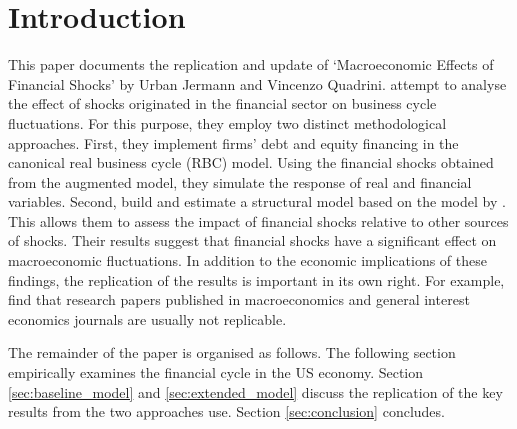 \section{Introduction}
\label{sec:introduction}

This paper documents the replication and update of ‘Macroeconomic Effects of Financial Shocks’ by Urban Jermann and Vincenzo Quadrini. \citeauthor{JERMANNfinancial} attempt to analyse the effect of shocks originated in the financial sector on business cycle fluctuations. For this purpose, they employ two distinct methodological approaches. First, they implement firms' debt and equity financing in the canonical real business cycle (RBC) model. Using the financial shocks obtained from the augmented model, they simulate the response of real and financial variables. Second, \citeauthor{JERMANNfinancial} build and estimate a structural model based on the model by \citet{SMETSshocks}. This allows them to assess the impact of financial shocks relative to other sources of shocks. Their results suggest that financial shocks have a significant effect on macroeconomic fluctuations. In addition to the economic implications of these findings, the replication of the results is important in its own right. For example, \cite{CHANGeconomics} find that research papers published in macroeconomics and general interest economics journals are usually not replicable. 

The remainder of the paper is organised as follows. The following section empirically examines the financial cycle in the US economy. Section \ref{sec:baseline_model} and \ref{sec:extended_model} discuss the replication of the key results from the two approaches \citeauthor{JERMANNfinancial} use. Section \ref{sec:conclusion} concludes.
